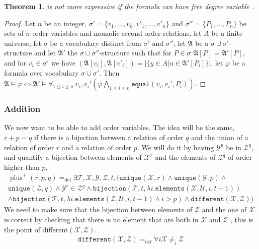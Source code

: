\documentclass[a4paper,12pt]{article}
\newcommand{\sss}[1]{\subsubsection{#1}}
\newtheorem{theorem}{Theorem}[section]
\theoremstyle{definition}
\renewcommand{\phi}{\varphi}
\DeclareMathOperator{\plu}{plus}
\newcommand{\mc}{\mathcal}
\newcommand{\mf}{\mathfrak}
\newcommand{\ed}{=_{\mathrm{def}}}
\begin{document}
\begin{theorem}
  \VO{} is not more expressive if the formula can have free degree
  variable .
\end{theorem}
\begin{proof}
  Let $n$ be an integer, $\sigma'=\{v_1,\dots,v_n,v'_1,\dots,v'_n\}$
  and $\sigma''=\{P_1,\dots,P_n\}$ be sets of $n$ order variables and
  monadic second order relations, let $A$ be a finite universe, let
  $\sigma$ be a vocabulary distinct from $\sigma'$ and $\sigma''$, let
  $\mf A$ be a $\sigma\cup\sigma'$-structure and let $\mf A'$ the
  $\sigma\cup\sigma''$-structure such that for $P\in\sigma$ $\mf
  A[P]=\mf A'[P]$, and for $v_i\in\sigma'$ we have $(\mf A[v_i],\mf
  A[v'_i])=|\{y\in A|u\in\mf A'[P_i]\}|$, let $\phi$ be a formula over
  vocabulary $\sigma\cup\sigma'$. Then $\mf A\models
  \phi\Leftrightarrow\mf A'\models \forall_{1\le i\le
    n'}v_i,v_i'(\phi\bigwedge_{1\le i\le n}\texttt{equal}(v_i,v_i',P_i))$.
\end{proof}
\sss{Addition}
We now want to be able to add order variables. The idea will be the
same, $r+p=q$ if there is a bijection between a relation of order $q$
and the union of a relation of order $r$ and a relation of order $p$.
We will do it by having $\mc Y^p$ be in $\mc Z^q$, and quantify a
bijection between elements of $\mc X^r$ and the elements of $\mc Z^q$
of order higher than $p$.
\begin{eqnarray}
  \label{eq:plus+}
  \plu^+(r,p,q)\ed\exists \mc{T,X,Y,Z},t,(\texttt{unique}(\mc X,r)\land\texttt{unique}(\mc Y,p)\land\nonumber\\
  \texttt{unique}(\mc Z,q)\land\mc Y^r\in\mc Z^q\land \texttt{bijection}(\mc T,t,\lambda i.\texttt{elements}(\mc X,\mc U,i,t-1))\nonumber\\
  \land \texttt{bijection}(\mc T,t,\lambda i.\texttt{elements}(\mc Z,\mc U,i,t-1)\land i>p)\land \texttt{different}(\mc X,\mc Z))
\end{eqnarray}
We need to make sure that the bijection between elements of $\mc Z$
and the one of $\mc X$ is correct by checking that there is no element
that are both in $\mc X$ and $\mc Z$ , this is the point of
different$\mc{(X,Z)}$.
\begin{eqnarray}
\label{eq:plus}
\texttt{different}(\mc X,\mc Z)\ed\forall i\mc X\not=_i\mc Z\end{eqnarray}
\end{document}

